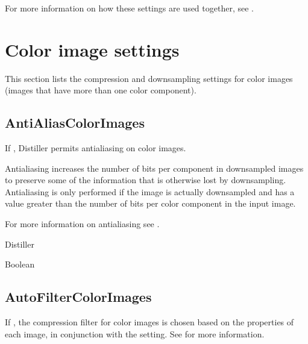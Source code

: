 \documentclass[letterpaper,12pt,english,openany,oneside]{sphinxmanual}
\begin{document}
For more information on how these settings are used together, see .




\section{Color image settings}
\label{\detokenize{PDF_Create_CommonSettings:color-image-settings}}
This section lists the compression and downsampling settings for color images (images that have more than one color component).




\subsection{AntiAliasColorImages}
\label{\detokenize{PDF_Create_CommonSettings:antialiascolorimages}}
If  , Distiller permits anti\sphinxhyphen{}aliasing on color images.

Anti\sphinxhyphen{}aliasing increases the number of bits per component in downsampled images to preserve some of the information that is otherwise lost by downsampling. Anti\sphinxhyphen{}aliasing is only performed if the image is actually downsampled and  has a value greater than the number of bits per color component in the input image.

For more information on anti\sphinxhyphen{}aliasing see .

\label{\detokenize{PDF_Create_CommonSettings:supported-by-17}}

Distiller

\label{\detokenize{PDF_Create_CommonSettings:type-17}}

Boolean

\label{\detokenize{PDF_Create_CommonSettings:default-value-14}}

\begin{sphinxVerbatim}[commandchars=\\\{\}]
\end{sphinxVerbatim}




\subsection{AutoFilterColorImages}
\label{\detokenize{PDF_Create_CommonSettings:autofiltercolorimages}}
If  , the compression filter for color images is chosen based on the properties of each image, in conjunction with the  setting. See  for more information.
\end{document}
